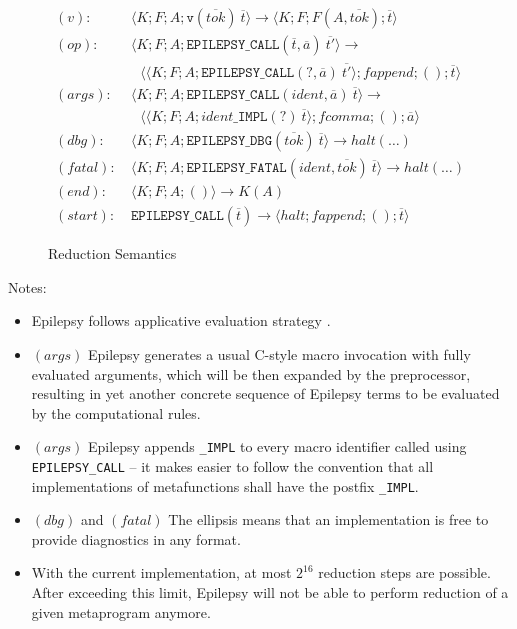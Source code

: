 \documentclass[12pt]{article}
\theoremstyle{break}
\begin{document}
\begin{figure}
    \caption{Reduction Semantics}

    \begin{align*}
        (v): & \ \langle K; F; A; \texttt{v}(\overline{tok}) \ \overline{t} \rangle \to
            \langle K; F; F(A, \overline{tok}); \overline{t} \rangle \\
        (op): & \ \langle K; F; A; \texttt{EPILEPSY\_CALL}(\overline{t}, \overline{a}) \ \overline{t'} \rangle \to \\
            & \ \ \ \ \langle \langle K; F; A; \texttt{EPILEPSY\_CALL}(?, \overline{a}) \ \overline{t'} \rangle; fappend; (); \overline{t} \rangle \\
        (args): & \ \langle K; F; A; \texttt{EPILEPSY\_CALL}(ident, \overline{a}) \ \overline{t} \rangle \to \\
            & \ \ \ \ \langle \langle K; F; A; ident\texttt{\_IMPL}(?) \ \overline{t} \rangle; fcomma; (); \overline{a} \rangle \\
        (dbg): & \ \langle K; F; A; \texttt{EPILEPSY\_DBG}(\overline{tok}) \ \overline{t} \rangle \to halt(\ldots) \\
        (fatal): & \ \langle K; F; A; \texttt{EPILEPSY\_FATAL}(ident, \overline{tok}) \ \overline{t} \rangle \to halt(\ldots) \\
        (end): & \ \langle K; F; A; () \rangle \to K(A) \\
        (start): & \ \texttt{EPILEPSY\_CALL}(\overline{t}) \to \langle halt; fappend; (); \overline{t} \rangle
    \end{align*}
    \label{ReductionSemantics}
\end{figure}

Notes:

\begin{itemize}
    \item Epilepsy follows applicative evaluation strategy \cite{ApplicativeEvaluationStrategy}.

    \item $(args)$ Epilepsy generates a usual C-style macro invocation with
    fully evaluated arguments, which will be then expanded by the preprocessor, resulting
    in yet another concrete sequence of Epilepsy terms to be evaluated by the computational
    rules.
    \item $(args)$ Epilepsy appends \texttt{\_IMPL} to every macro identifier called using
    \texttt{EPILEPSY\_CALL} -- it makes easier to follow the convention that all implementations
    of metafunctions shall have the postfix \texttt{\_IMPL}.
    \item $(dbg)$ and $(fatal)$ The ellipsis means that an implementation is free to provide
    diagnostics in any format.
    \item With the current implementation, at most $2^{16}$ reduction steps are
    possible. After exceeding this limit, Epilepsy will not be able to perform reduction
    of a given metaprogram anymore.
\end{itemize}
\end{document}
